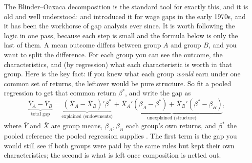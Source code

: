 \documentclass[
    a4paper,
    fontsize=10pt,
    twoside=true,
    numbers=noenddot,
]{kaobook}
\begin{document}
The Blinder--Oaxaca decomposition is the standard tool for exactly this, and it is old and well understood: \textcite{blinder1973wage} and \textcite{oaxaca1973male} introduced it for wage gaps in the early 1970s, and it has been the workhorse of gap analysis ever since. It is worth following the logic in one pass, because each step is small and the formula below is only the last of them. A mean outcome differs between group $A$ and group $B$, and you want to split the difference. For each group you can see the outcome, the characteristics, and (by regression) what each characteristic is worth in that group. Here is the key fact: if you knew what each group \emph{would} earn under one common set of returns, the leftover would be pure structure. So fit a pooled regression to get that common return $\beta^\ast$, and write the gap as
\[
\underbrace{\bar Y_A-\bar Y_B}_{\text{total gap}}
=\underbrace{(\bar X_A-\bar X_B)'\beta^\ast}_{\text{explained (endowments)}}
+\underbrace{\bar X_A'(\beta_A-\beta^\ast)+\bar X_B'(\beta^\ast-\beta_B)}_{\text{unexplained (structure)}},
\]
where $\bar Y$ and $\bar X$ are group means, $\beta_A,\beta_B$ each group's own returns, and $\beta^\ast$ the pooled reference the pooled regression supplies \parencite{jann2008oaxaca}. The first term is the gap you would still see if both groups were paid by the same rules but kept their own characteristics; the second is what is left once composition is netted out.
\end{document}
